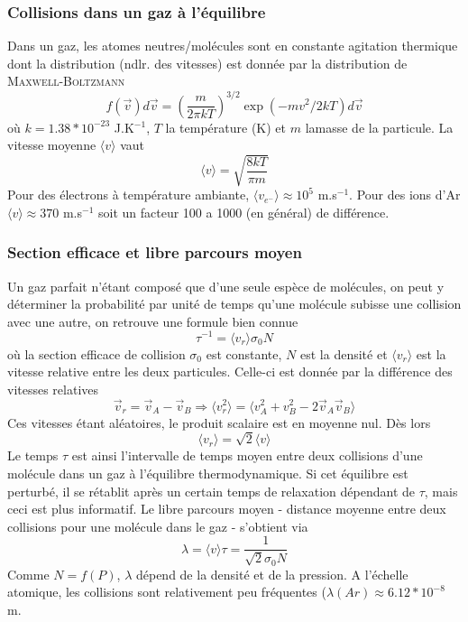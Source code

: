 		\subsubsection{Collisions dans un gaz à l'équilibre}
		Dans un gaz, les atomes neutres/molécules sont en constante agitation thermique dont la
		distribution (ndlr. des vitesses) est donnée par la distribution de 
		\textsc{Maxwell-Boltzmann}
		\begin{equation}
		f(\vec{v})d\vec{v}=\left( \frac{m}{2\pi kT}\right)^{3/2}\exp{(-mv^2/2kT)}d\vec{v}
		\end{equation}
		où $k=1.38*10^{-23}$ J.K$^{-1}$, $T$ la température (K) et $m$ lamasse de la particule. La
		vitesse moyenne $\langle v\rangle$ vaut
		\begin{equation}
		\langle v\rangle=\sqrt{\frac{8kT}{\pi m}}
		\end{equation}
		Pour des électrons à température ambiante, $\langle v_{e^-}\rangle \approx 10^5$ m.s$^{-1}$.
		Pour des ions d'Ar $\langle v\rangle \approx 370$ m.s$^{-1}$ soit un facteur 100 a 1000 
		(en général) de différence.
		
		
		\subsubsection{Section efficace et libre parcours moyen}
		Un gaz parfait n'étant composé que d'une seule espèce de molécules, on peut y déterminer 
		la probabilité par unité de temps qu'une molécule subisse une collision avec une autre, 
		on retrouve une formule bien connue
		\begin{equation}
		\tau^{-1}=\langle v_r\rangle\sigma_0 N
		\end{equation}				
		où la section efficace de collision $\sigma_0$ est constante, $N$ est la densité et 
		$\langle v_r\rangle$ est la vitesse relative entre les deux particules. Celle-ci est 
		donnée par la différence des vitesses relatives
		\begin{equation}
		\overrightarrow{v}_r=\overrightarrow{v}_A-\overrightarrow{v}_B \Rightarrow \langle
		 v_r^2\rangle=\langle v_A^2+v_B^2-2\overrightarrow{v}_A\overrightarrow{v}_B\rangle
		\end{equation}
		Ces vitesses étant aléatoires, le produit scalaire est en moyenne nul. Dès lors
		\begin{equation}
		\langle v_r\rangle = \sqrt{2}\langle v\rangle
		\end{equation}
		Le temps $\tau$ est ainsi l'intervalle de temps moyen entre deux collisions d'une 
		molécule dans un gaz à l'équilibre thermodynamique. Si cet équilibre est perturbé, il 
		se rétablit après un certain temps de relaxation dépendant de $\tau$, mais ceci est plus 
		informatif. Le libre parcours moyen - distance moyenne entre deux collisions pour une 
		molécule dans le gaz - s'obtient via
		\begin{equation}
		\lambda=\langle v \rangle\tau=\frac{1}{\sqrt{2}\sigma_0 N}
		\end{equation}
		Comme $N=f(P)$, $\lambda$ dépend de la densité et de la pression. A l'échelle atomique, les
		collisions sont relativement peu fréquentes ($\lambda(Ar) \approx 6.12*10^{-8}$ m.

